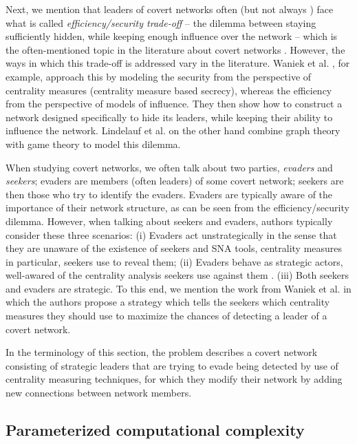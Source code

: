 Next, we mention that leaders of covert networks often (but not always \cite{Fatih2012}) face what is called
\emph{efficiency/security trade-off} \cite{Morselli2007} --
the dilemma between staying sufficiently hidden, while keeping enough influence over the network --
which is the often-mentioned topic in the literature about covert networks \cite{Crossley2012,Waniek2017,Lindelauf2009}.
However, the ways in which this trade-off is addressed vary in the literature.
Waniek et al. \cite{Waniek2017}, for example, approach this by modeling the security from the perspective of
centrality measures (centrality measure based secrecy), whereas the efficiency from the perspective of models of influence.
They then show how to construct a network designed specifically to hide its leaders, while
keeping their ability to influence the network.
Lindelauf et al. \cite{Lindelauf2009} on the other hand combine graph theory with game theory to model this dilemma.

When studying covert networks, we often talk about two parties, \emph{evaders} and \emph{seekers};
evaders are members (often leaders) of some covert network;
seekers are then those who try to identify the evaders.
Evaders are typically aware of the importance of their network structure, as can be seen from
the efficiency/security dilemma.
However, when talking about seekers and evaders, authors typically consider these three scenarios:
(i) Evaders act unstrategically in the sense that they are unaware of
the existence of seekers and SNA tools, centrality measures in particular, seekers use to reveal them;
(ii) Evaders behave as strategic actors, well-awared of the centrality analysis seekers use against them \cite{Waniek2017,Dey2019,Dey2020}.
(iii) Both seekers and evaders are strategic.
To this end, we mention the work from Waniek et al. \cite[y.~2021]{Waniek2021} in which the authors propose
a strategy which tells the seekers which centrality measures they should use to maximize the chances of detecting
a leader of a covert network.

In the terminology of this section, the \HL problem describes a covert network consisting of strategic leaders
that are trying to evade being detected by use of centrality measuring techniques,
for which they modify their network by adding new connections between network members. 

\subsection{Parameterized computational complexity}

